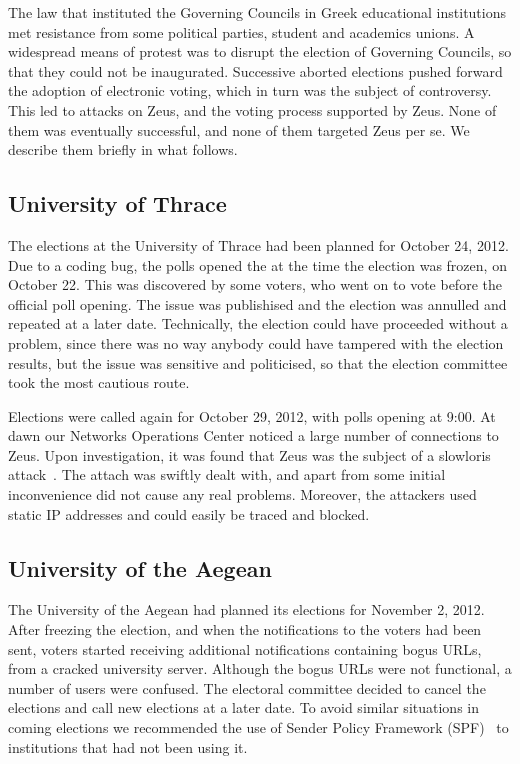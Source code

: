 \documentclass[letterpaper,twocolumn,10pt]{article}
\begin{document}
The law that instituted the Governing Councils in Greek educational
institutions met resistance from some political parties, student and
academics unions. A widespread means of protest was to disrupt the
election of Governing Councils, so that they could not be inaugurated.
Successive aborted elections pushed forward the adoption of electronic
voting, which in turn was the subject of controversy. This led to
attacks on Zeus, and the voting process supported by Zeus. None of
them was eventually successful, and none of them targeted Zeus per se.
We describe them briefly in what follows.

\subsection{University of Thrace}

The elections at the University of Thrace had been planned for October
24, 2012. Due to a coding bug, the polls opened the at the time the
election was frozen, on October 22. This was discovered by some
voters, who went on to vote before the official poll opening. The
issue was publishised and the election was annulled and repeated at a
later date. Technically, the election could have proceeded without a
problem, since there was no way anybody could have tampered with the
election results, but the issue was sensitive and politicised, so that
the election committee took the most cautious route.

Elections were called again for October 29, 2012, with polls opening
at 9:00. At dawn our Networks Operations Center noticed a large number
of connections to Zeus. Upon investigation, it was found that Zeus was
the subject of a slowloris attack~\cite{slowloris}. The attach was
swiftly dealt with, and apart from some initial inconvenience did not
cause any real problems. Moreover, the attackers used static IP
addresses and could easily be traced and blocked.

\subsection{University of the Aegean}

The University of the Aegean had planned its elections for November 2,
2012. After freezing the election, and when the notifications to the
voters had been sent, voters started receiving additional
notifications containing bogus URLs, from a cracked university server.
Although the bogus URLs were not functional, a number of users were
confused. The electoral committee decided to cancel the elections and
call new elections at a later date. To avoid similar situations in
coming elections we recommended the use of Sender Policy Framework
(SPF)~\cite{rfc4408} to institutions that had not been using it.
\end{document}
